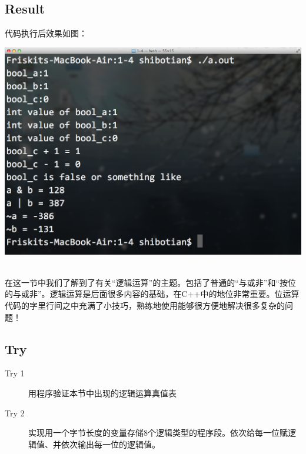 \subsection{Result}
代码执行后效果如图：
\\[\intextsep] 
  \begin{minipage}{\textwidth} 
    \centering 
    \includegraphics{codes/1-4/result.png}
    \label{fig:code-1-4-result} 
  \end{minipage} 
\\[\intextsep]

在这一节中我们了解到了有关“逻辑运算”的主题。包括了普通的“与或非”和“按位的与或非”。逻辑运算是后面很多内容的基础，在C++中的地位非常重要。位运算代码的字里行间之中充满了小技巧，熟练地使用能够很方便地解决很多复杂的问题！
\subsection{Try}
\begin{description}
	\item[Try 1]用程序验证本节中出现的逻辑运算真值表
	\item[Try 2]实现用一个字节长度的变量存储8个逻辑类型的程序段。依次给每一位赋逻辑值、并依次输出每一位的逻辑值。
\end{description}


